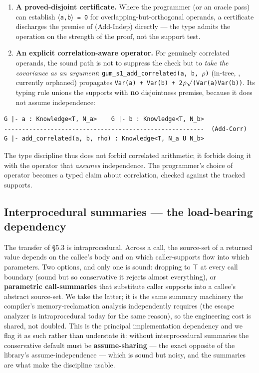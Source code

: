 \documentclass[sigplan,review,anonymous,10pt]{acmart}
\begin{document}
\begin{enumerate}
  \item \textbf{A proved-disjoint certificate.} Where the programmer (or an oracle pass) can establish \texttt{$\langle$a,b$\rangle$ = 0} for overlapping-but-orthogonal operands, a certificate discharges the premise of (Add-Indep) directly --- the type admits the operation on the strength of the proof, not the support test.
  \item \textbf{An explicit correlation-aware operator.} For genuinely correlated operands, the sound path is not to suppress the check but to \emph{take the covariance as an argument}: \texttt{gum\_s1\_add\_correlated(a, b, $\rho$)} (in-tree, , currently orphaned) propagates \texttt{Var(a) + Var(b) + 2$\rho\surd$(Var(a)Var(b))}. Its typing rule unions the supports with \textbf{no} disjointness premise, because it does not assume independence:
\end{enumerate}

\begin{lstlisting}
G |- a : Knowledge<T, N_a>    G |- b : Knowledge<T, N_b>
--------------------------------------------------------  (Add-Corr)
G |- add_correlated(a, b, rho) : Knowledge<T, N_a U N_b>
\end{lstlisting}

The type discipline thus does not forbid correlated arithmetic; it forbids doing it with the operator that \emph{assumes} independence. The programmer's choice of operator becomes a typed claim about correlation, checked against the tracked supports.

\subsection{Interprocedural summaries --- the load-bearing dependency}

The transfer of §5.3 is intraprocedural. Across a call, the source-set of a returned value depends on the callee's body and on which caller-supports flow into which parameters. Two options, and only one is sound: dropping to \texttt{$\top$} at every call boundary (sound but so conservative it rejects almost everything), or \textbf{parametric call-summaries} that substitute caller supports into a callee's abstract source-set. We take the latter; it is the same summary machinery the compiler's memory-reclamation analysis independently requires (the escape analyzer is intraprocedural today for the same reason), so the engineering cost is shared, not doubled. This is the principal implementation dependency and we flag it as such rather than understate it: without interprocedural summaries the conservative default must be \textbf{assume-sharing} --- the exact opposite of the library's assume-independence --- which is sound but noisy, and the summaries are what make the discipline usable.
\end{document}
